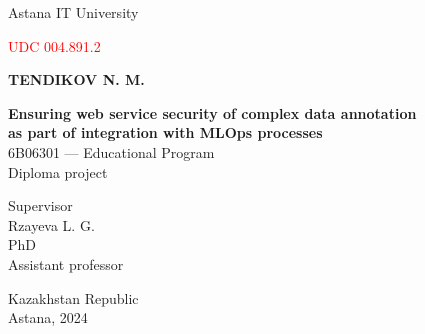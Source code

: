 \thispagestyle{empty}
\begin{center}
Astana IT University    
\end{center}
\vspace*{1cm}

\noindent \textcolor{red}{UDC 004.891.2}

\vspace*{2.5cm} %

\begin{center} %

\textbf{TENDIKOV N. M.}  \\

\vspace*{2cm}

\textbf{Ensuring web service security of complex data annotation \\
as part of integration with MLOps processes}\\

\vspace*{2cm}
6B06301 --- Educational Program\\
\vspace*{1cm}
Diploma project
\end{center}
%
\vspace*{3cm}

\noindent\hspace*{0.5\textwidth}Supervisor\\
\noindent\hspace*{0.5\textwidth}Rzayeva L. G.\\
\noindent\hspace*{0.5\textwidth}PhD\\
\noindent\hspace*{0.5\textwidth}Assistant professor\\
%
\vspace*{0.1cm}

\vfill
\begin{center}
Kazakhstan Republic\\
Astana,  2024
\end{center}